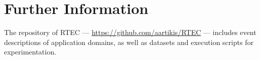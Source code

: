 
\section{Further Information}

The repository of RTEC --- \url{https://github.com/aartikis/RTEC} --- includes event descriptions of application domains, as well as datasets and execution scripts for experimentation. 